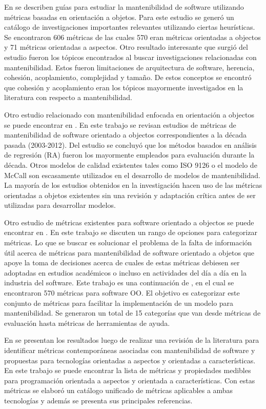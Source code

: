 En \cite{roadmap} se describen guías para estudiar la mantenibilidad de software
utilizando métricas basadas en orientación a objetos. Para este estudio
se generó un catálogo de investigaciones importantes relevantes utilizando
ciertas heurísticas. Se encontraron 606 métricas de las cuales 570 eran métricas
orientadas a objectos y 71 métricas orientadas a aspectos. Otro resultado
interesante que surgió del estudio fueron los tópicos encontrados al buscar
investigaciones relacionadas con mantenibilidad. Estos fueron limitaciones
de arquitectura de software, herencia, cohesión, acoplamiento, complejidad
y tamaño. De estos conceptos se encontró que cohesión y acoplamiento eran
los tópicos mayormente investigados en la literatura con respecto a mantenibilidad.

Otro estudio relacionado con mantenibilidad enfocada en orientación a objectos
se puede encontrar en \cite{pastDecade}. En este trabajo se revisan estudios
de métricas de mantenibilidad de software orientado a objectos correspondientes
a la década pasada (2003-2012). Del estudio se concluyó que los métodos
basados en análisis de regresión (RA) fueron los mayormente empleados para
evaluación durante la década. Otros modelos de calidad existentes tales como
ISO 9126 o el modelo de McCall son escasamente utilizados en el desarrollo
de modelos de mantenibilidad. La mayoría de los estudios obtenidos en la investigación
hacen uso de las métricas orientadas a objetos existentes sin una revisión
y adaptación crítica antes de ser utilizadas para desarrollar modelos.

Otro estudio de métricas existentes para software orientado a objectos se puede
encontrar en \cite{TowardsACatalog}. En este trabajo se discuten un rango de
opciones para categorizar métricas. Lo que se buscar es solucionar el problema
de la falta de información útil acerca de métricas para mantenibilidad de 
software orientado a objetos que apoye la toma de decisiones acerca de cuales
de estas métricas debiesen ser adoptadas en estudios académicos o incluso
en actividades del día a día en la industria del software. Este trabajo
es una continuación de \cite{roadmap}, en el cual se encontraron 570
métricas para software OO. El objetivo es categorizar este conjunto de métricas
 para facilitar la implementación de un modelo para mantenibilidad. 
 Se generaron un total de 15 categorías que van desde métricas de evaluación
 hasta métricas de herramientas de ayuda.

 En \cite{SystematicReview} se presentan los resultados luego de realizar
 una revisión de la literatura para identificar métricas contemporáneas 
 asociadas con mantenibilidad de software y propuestas para tecnologías
 orientadas a aspectos y orientadas a características. En este trabajo
 se puede encontrar la lista de métricas y propiedades medibles para programación
 orientada a aspectos y orientada a características. Con estas métricas se 
 elaboró un catálogo unificado de métricas aplicables a ambas tecnologías
 y además se presenta sus principales referencias.

